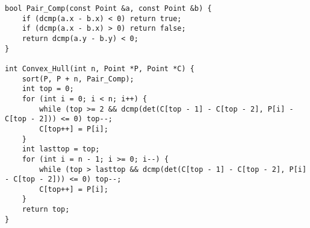 \begin{lstlisting}
bool Pair_Comp(const Point &a, const Point &b) {
	if (dcmp(a.x - b.x) < 0) return true;
	if (dcmp(a.x - b.x) > 0) return false;
	return dcmp(a.y - b.y) < 0;
}

int Convex_Hull(int n, Point *P, Point *C) {
	sort(P, P + n, Pair_Comp);
	int top = 0;
	for (int i = 0; i < n; i++) {
		while (top >= 2 && dcmp(det(C[top - 1] - C[top - 2], P[i] - C[top - 2])) <= 0) top--;
		C[top++] = P[i];
	}
	int lasttop = top;
	for (int i = n - 1; i >= 0; i--) {
		while (top > lasttop && dcmp(det(C[top - 1] - C[top - 2], P[i] - C[top - 2])) <= 0) top--;
		C[top++] = P[i];
	}
	return top;
}
\end{lstlisting}
